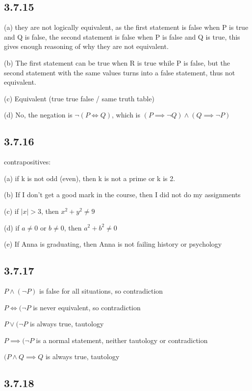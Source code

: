 \documentclass{article}
\begin{document}
\subsection*{3.7.15}

(a) they are not logically equivalent, as the first statement is false when P is true and Q is false, the second statement is false when P is false and Q is true, this gives enough reasoning of why they are not equivalent. 

(b) The first statement can be true when R is true while P is false,  but the second statement with the same values turns into a false statement, thus not equivalent.

(c) Equivalent (true true false / same truth table)

(d) No, the negation is $\neg (P\iff Q)$, which is $(P\implies \neg Q)\land (Q \implies \neg P)$

\subsection*{3.7.16}

contrapositives:

(a) if k is not odd (even), then k is not a prime or k is 2.

(b) If I don't get a good mark in the course, then I did not do my assignments

(c) if $|x|>3$, then $x^2+y^2\neq 9$

(d) if $a \neq 0$ or $b \neq 0$, then $a^2+b^2\neq 0$

(e) If Anna is graduating, then Anna is not failing history or psychology 

\subsection*{3.7.17}

$P\land (\neg P)$ is false for all situations, so contradiction

$P\iff (\neg P$ is never equivalent, so contradiction

$P\lor (\neg P$ is always true, tautology

$P\implies (\neg P$ is a normal statement, neither tautology or contradiction

$(P\land Q\implies Q$ is always true, tautology

\subsection*{3.7.18}
\end{document}
